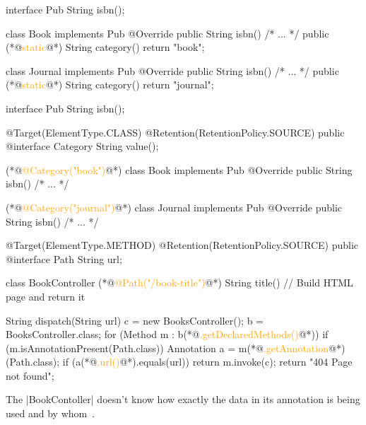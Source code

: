 \documentclass{article}
\begin{document}

\begin{pptWide}{2}
{\scriptsize\begin{ffcode}
interface Pub
  String isbn();

class Book implements Pub
  @Override public String isbn()
    /* ... */
  public (*@\textcolor{orange}{static}@*) String category()
    return "book";

class Journal implements Pub
  @Override public String isbn()
    /* ... */
  public (*@\textcolor{orange}{static}@*) String category()
    return "journal";
\end{ffcode}
}
\par\columnbreak\par
{\scriptsize\begin{ffcode}
interface Pub
  String isbn();

@Target(ElementType.CLASS)
@Retention(RetentionPolicy.SOURCE)
public @interface Category
  String value();

(*@\textcolor{orange}{@Category("book")}@*)
class Book implements Pub
  @Override public String isbn()
    /* ... */

(*@\textcolor{orange}{@Category("journal")}@*)
class Journal implements Pub
  @Override public String isbn()
    /* ... */
\end{ffcode}
}
\end{pptWide}
\par
\plush{}

\begin{pptWide}{2}
{\small\begin{ffcode}
@Target(ElementType.METHOD)
@Retention(RetentionPolicy.SOURCE)
public @interface Path
  String url;

class BookController
  (*@\textcolor{orange}{@Path("/book-title")}@*)
  String title()
    // Build HTML page and return it
\end{ffcode}
}
\par\columnbreak\par
{\scriptsize\begin{ffcode}
String dispatch(String url) {
  c = new BooksController();
  b = BooksController.class;
  for (Method m : b(*@\textcolor{orange}{.getDeclaredMethods()}@*)) {
    if (m.isAnnotationPresent(Path.class)) {
      Annotation a = m(*@\textcolor{orange}{.getAnnotation}@*)(Path.class);
      if (a(*@\textcolor{orange}{.url()}@*).equals(url)) {
        return m.invoke(c);
      }
    }
  }
  return "404 Page not found";
}
\end{ffcode}
}
\end{pptWide}
\par
The |BookContoller| doesn't know how exactly the data
in its annotation is being used and by whom~\citep{bugayenko2016blog0412}.
\plush{}
\end{document}
